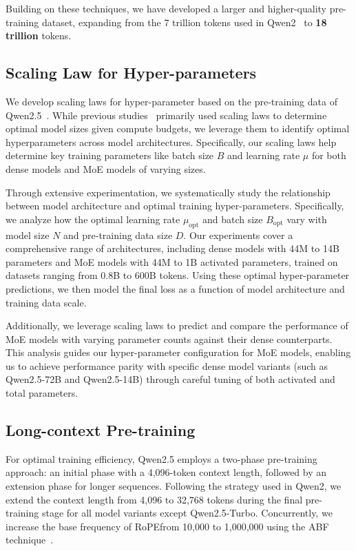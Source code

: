 Building on these techniques, we have developed a larger and higher-quality pre-training dataset, expanding from the 7 trillion tokens used in Qwen2~\citep{qwen2} to \textbf{18 trillion} tokens.

\subsection{Scaling Law for Hyper-parameters}
We develop scaling laws for hyper-parameter based on the pre-training data of Qwen2.5~\citep{chinchilla,kaplanscaling}. While previous studies~\citep{llama3,falcon,chinchilla} primarily used scaling laws to determine optimal model sizes given compute budgets, we leverage them to identify optimal hyperparameters across model architectures. Specifically, our scaling laws help determine key training parameters like batch size $B$ and learning rate $\mu$ for both dense models and MoE models of varying sizes.

Through extensive experimentation, we systematically study the relationship between model architecture and optimal training hyper-parameters. Specifically, we analyze how the optimal learning rate $\mu_\textrm{opt}$ and batch size $B_\textrm{opt}$ vary with model size $N$ and pre-training data size $D$. Our experiments cover a comprehensive range of architectures, including dense models with 44M to 14B parameters and MoE models with 44M to 1B activated parameters, trained on datasets ranging from 0.8B to 600B tokens. Using these optimal hyper-parameter predictions, we then model the final loss as a function of model architecture and training data scale.

Additionally, we leverage scaling laws to predict and compare the performance of MoE models with varying parameter counts against their dense counterparts. This analysis guides our hyper-parameter configuration for MoE models, enabling us to achieve performance parity with specific dense model variants (such as Qwen2.5-72B and Qwen2.5-14B) through careful tuning of both activated and total parameters.



\subsection{Long-context Pre-training}

For optimal training efficiency, Qwen2.5 employs a two-phase pre-training approach: an initial phase with a 4,096-token context length, followed by an extension phase for longer sequences. Following the strategy used in Qwen2, we extend the context length from 4,096 to 32,768 tokens during the final pre-training stage for all model variants except Qwen2.5-Turbo. Concurrently, we increase the base frequency of RoPEfrom 10,000 to 1,000,000 using the ABF technique~\citep{ropeabf}.

